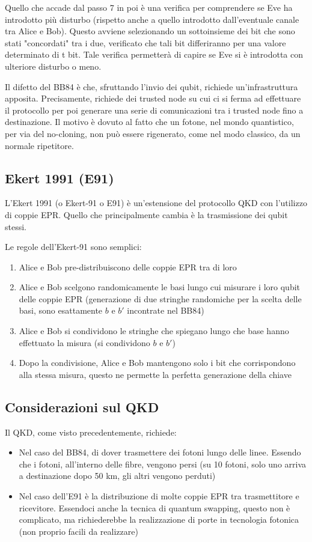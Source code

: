 Quello che accade dal passo 7 in poi è una verifica per comprendere se Eve ha introdotto più disturbo (rispetto anche a quello introdotto dall'eventuale canale tra Alice e Bob). Questo avviene selezionando un sottoinsieme dei bit che sono stati "concordati" tra i due, verificato che tali bit differiranno per una valore determinato di t bit. Tale verifica permetterà di capire se Eve si è introdotta con ulteriore disturbo o meno. 

Il difetto del BB84 è che, sfruttando l'invio dei qubit, richiede un'infrastruttura apposita. Precisamente, richiede dei trusted node su cui ci si ferma ad effettuare il protocollo per poi generare una serie di comunicazioni tra i trusted node fino a destinazione. Il motivo è dovuto al fatto che un fotone, nel mondo quantistico, per via del no-cloning, non può essere rigenerato, come nel modo classico, da un normale ripetitore.

\subsection{Ekert 1991 (E91)}
L'Ekert 1991 (o Ekert-91 o E91) è un'estensione del protocollo QKD con l'utilizzo di coppie EPR. Quello che principalmente cambia è la trasmissione dei qubit stessi.

Le regole dell'Ekert-91 sono semplici:
\begin{enumerate}
    \item Alice e Bob pre-distribuiscono delle coppie EPR tra di loro
    \item Alice e Bob scelgono randomicamente le basi lungo cui misurare i loro qubit delle coppie EPR (generazione di due stringhe randomiche per la scelta delle basi, sono esattamente \(b\) e \(b'\) incontrate nel BB84)
    \item Alice e Bob si condividono le stringhe che spiegano lungo che base hanno effettuato la misura (si condividono \(b\) e \(b'\))
    \item Dopo la condivisione, Alice e Bob mantengono solo i bit che corrispondono alla stessa misura, questo ne permette la perfetta generazione della chiave
\end{enumerate}


\subsection{Considerazioni sul QKD}
Il QKD, come visto precedentemente, richiede:
\begin{itemize}
    \item Nel caso del BB84, di dover trasmettere dei fotoni lungo delle linee. Essendo che i fotoni, all'interno delle fibre, vengono persi (su 10 fotoni, solo uno arriva a destinazione dopo 50 km, gli altri vengono perduti)
    \item Nel caso dell'E91 è la distribuzione di molte coppie EPR tra trasmettitore e ricevitore. Essendoci anche la tecnica di quantum swapping, questo non è complicato, ma richiederebbe la realizzazione di porte in tecnologia fotonica (non proprio facili da realizzare)
\end{itemize}

